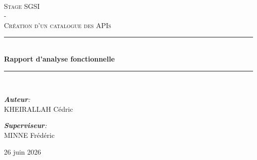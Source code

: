 \begin{titlepage}

    \newcommand{\HRule}{\rule{\linewidth}{0.5mm}} %
    \center 
     
    \vspace*{0.8cm}
    \\[1cm]
    
    \textsc{\Large Stage SGSI\\ - \\ \bigskip Création d'un catalogue des APIs}\\[1.5cm] %
    
    \HRule \\[0.8cm]
    
    {\huge \bfseries Rapport d'analyse fonctionnelle}\\[0.7cm] %
    
    \HRule \\[1.5cm]
    
    
    \large
    

    \emph{\textbf{Auteur}:}\\
    KHEIRALLAH Cédric\\

    \vspace{1cm}

    \emph{\textbf{Superviseur}:}\\
    MINNE Frédéric\\

    \vfill
    
    \large 26 juin 2026
    
\end{titlepage}